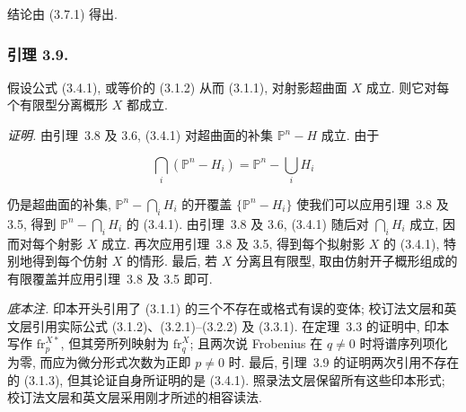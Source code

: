 结论由 (3.7.1) 得出.

\subsubsection*{引理 3.9.}
假设公式 (3.4.1), 或等价的 (3.1.2) 从而 (3.1.1), 对射影超曲面 $X$ 成立.
则它对每个有限型分离概形 $X$ 都成立.

\medskip
\noindent\emph{证明.}
由引理~3.8 及 3.6, (3.4.1) 对超曲面的补集 $\mathbb P^n-H$ 成立. 由于

\[
\bigcap_i(\mathbb P^n-H_i)=\mathbb P^n-\bigcup_iH_i
\]

仍是超曲面的补集, $\mathbb P^n-\bigcap_iH_i$ 的开覆盖 $\{\mathbb P^n-H_i\}$
使我们可以应用引理~3.8 及 3.5, 得到 $\mathbb P^n-\bigcap_iH_i$ 的 (3.4.1).
由引理~3.8 及 3.6, (3.4.1) 随后对 $\bigcap_iH_i$ 成立,
因而对每个射影 $X$ 成立. 再次应用引理~3.8 及 3.5,
得到每个拟射影 $X$ 的 (3.4.1), 特别地得到每个仿射 $X$ 的情形.
最后, 若 $X$ 分离且有限型, 取由仿射开子概形组成的有限覆盖并应用引理~3.8 及 3.5 即可.

\medskip
\noindent\emph{底本注.}
印本开头引用了 (3.1.1) 的三个不存在或格式有误的变体;
校订法文层和英文层引用实际公式 (3.1.2)、(3.2.1)--(3.2.2) 及 (3.3.1).
在定理~3.3 的证明中, 印本写作 $\mathrm{fr}_p^{X*}$,
但其旁所列映射为 $\mathrm{fr}_q^X$;
且两次说 Frobenius 在 $q\ne0$ 时将谱序列项化为零,
而应为微分形式次数为正即 $p\ne0$ 时.
最后, 引理~3.9 的证明两次引用不存在的 (3.1.3),
但其论证自身所证明的是 (3.4.1). 照录法文层保留所有这些印本形式;
校订法文层和英文层采用刚才所述的相容读法.

